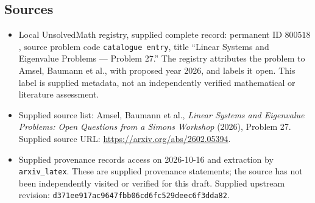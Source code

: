 \documentclass[11pt]{article}
\begin{document}
\subsection{Sources}
\begin{itemize}
\item Local UnsolvedMath registry, supplied complete record: permanent ID \(800518\), source problem code \texttt{catalogue entry}, title ``Linear Systems and Eigenvalue Problems --- Problem 27.'' The registry attributes the problem to Amsel, Baumann et al., with proposed year 2026, and labels it open. This label is supplied metadata, not an independently verified mathematical or literature assessment.
\item Supplied source list: Amsel, Baumann et al., \emph{Linear Systems and Eigenvalue Problems: Open Questions from a Simons Workshop} (2026), Problem 27. Supplied source URL: \url{https://arxiv.org/abs/2602.05394}.
\item Supplied provenance records access on 2026-10-16 and extraction by \texttt{arxiv\_latex}. These are supplied provenance statements; the source has not been independently visited or verified for this draft. Supplied upstream revision: \texttt{d371ee917ac9647fbb06cd6fc529deec6f3dda82}.
\end{itemize}
\end{document}
